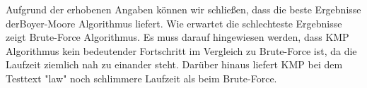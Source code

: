 \documentclass[14pt]{article}
\begin{document}
Aufgrund der erhobenen Angaben können wir schließen, dass die beste Ergebnisse derBoyer-Moore Algorithmus liefert. Wie erwartet die schlechteste Ergebnisse zeigt Brute-Force Algorithmus. Es muss darauf hingewiesen werden, dass KMP Algorithmus kein bedeutender Fortschritt im Vergleich zu Brute-Force ist, da die Laufzeit ziemlich nah zu einander steht. Darüber hinaus liefert KMP bei dem Testtext "law" noch schlimmere Laufzeit als beim Brute-Force.     
\end{document}
